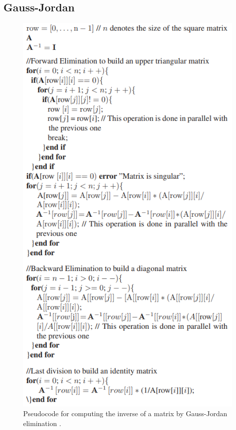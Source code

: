 



\subsection{Gauss-Jordan}

\begin{figure}[H]
\centering
   \includegraphics[scale=0.6]{images/gauss_jordan_pseudocode.PNG}
  \caption{ Pseudocode for computing the inverse of a matrix by Gauss-Jordan elimination \cite{gauss_jordan_fpga}. } 
  \label{fig:gauss_jordan_pseudocode}
\end{figure}